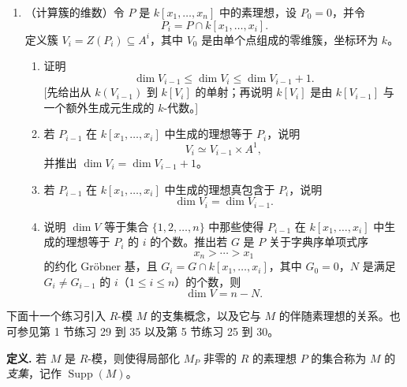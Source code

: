 \begin{enumerate}[label=\arabic*.]
	\item （计算簇的维数）令 $P$ 是 $k[x_1,\ldots,x_n]$ 中的素理想，设 $P_0=0$，并令
	\[
	P_i=P\cap k[x_1,\ldots,x_i].
	\]
	定义簇 $V_i=Z(P_i)\subseteq A^i$，其中 $V_0$ 是由单个点组成的零维簇，坐标环为 $k$。
	\begin{enumerate}[label=(\alph*)]
		\item 证明
		\[
		\dim V_{i-1}\le \dim V_i\le \dim V_{i-1}+1.
		\]
		[先给出从 $k(V_{i-1})$ 到 $k[V_i]$ 的单射；再说明 $k[V_i]$ 是由 $k[V_{i-1}]$ 与一个额外生成元生成的 $k$-代数。]
		\item 若 $P_{i-1}$ 在 $k[x_1,\ldots,x_i]$ 中生成的理想等于 $P_i$，说明
		\[
		V_i\simeq V_{i-1}\times A^1,
		\]
		并推出 $\dim V_i=\dim V_{i-1}+1$。
		\item 若 $P_{i-1}$ 在 $k[x_1,\ldots,x_i]$ 中生成的理想真包含于 $P_i$，说明
		\[
		\dim V_i=\dim V_{i-1}.
		\]
		\item 说明 $\dim V$ 等于集合 $\{1,2,
		\ldots,n\}$ 中那些使得 $P_{i-1}$ 在 $k[x_1,
		\ldots,x_i]$ 中生成的理想等于 $P_i$ 的 $i$ 的个数。推出若 $G$ 是 $P$ 关于字典序单项式序
		\[
		x_n>\cdots>x_1
		\]
		的约化 Gröbner 基，且 $G_i=G\cap k[x_1,
		\ldots,x_i]$，其中 $G_0=0$，$N$ 是满足 $G_i\ne G_{i-1}$ 的 $i$（$1\le i\le n$）的个数，则
		\[
		\dim V=n-N.
		\]
	\end{enumerate}
\end{enumerate}

下面十一个练习引入 $R$-模 $M$ 的支集概念，以及它与 $M$ 的伴随素理想的关系。也可参见第 1 节练习 29 到 35 以及第 5 节练习 25 到 30。

\noindent\textbf{定义.} 若 $M$ 是 $R$-模，则使得局部化 $M_P$ 非零的 $R$ 的素理想 $P$ 的集合称为 $M$ 的\emph{支集}，记作 $\operatorname{Supp}(M)$。

